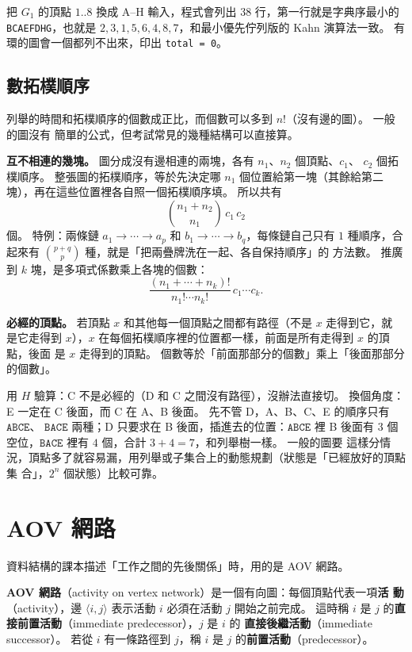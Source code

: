 把 $G_1$ 的頂點 $1..8$ 換成 A--H 輸入，程式會列出 $38$ 行，第一行就是字典序最小的
\texttt{BCAEFDHG}，也就是 $2, 3, 1, 5, 6, 4, 8, 7$，和最小優先佇列版的 Kahn 演算法一致。
有環的圖會一個都列不出來，印出 \texttt{total = 0}。

\subsection{數拓樸順序}

列舉的時間和拓樸順序的個數成正比，而個數可以多到 $n!$（沒有邊的圖）。 一般的圖沒有
簡單的公式，但考試常見的幾種結構可以直接算。

\textbf{互不相連的幾塊。} 圖分成沒有邊相連的兩塊，各有 $n_1$、$n_2$ 個頂點、$c_1$、
$c_2$ 個拓樸順序。 整張圖的拓樸順序，等於先決定哪 $n_1$ 個位置給第一塊（其餘給第二
塊），再在這些位置裡各自照一個拓樸順序填。 所以共有
\[
\binom{n_1 + n_2}{n_1} \, c_1 \, c_2
\]
個。 特例：兩條鏈 $a_1 \to \cdots \to a_p$ 和 $b_1 \to \cdots \to b_q$，每條鏈自己只有
$1$ 種順序，合起來有 $\binom{p + q}{p}$ 種，就是「把兩疊牌洗在一起、各自保持順序」的
方法數。 推廣到 $k$ 塊，是多項式係數乘上各塊的個數：
\[
\frac{(n_1 + \cdots + n_k)!}{n_1! \cdots n_k!} \, c_1 \cdots c_k.
\]

\textbf{必經的頂點。} 若頂點 $x$ 和其他每一個頂點之間都有路徑（不是 $x$ 走得到它，就
是它走得到 $x$），$x$ 在每個拓樸順序裡的位置都一樣，前面是所有走得到 $x$ 的頂點，後面
是 $x$ 走得到的頂點。 個數等於「前面那部分的個數」乘上「後面那部分的個數」。

用 $H$ 驗算：C 不是必經的（D 和 C 之間沒有路徑），沒辦法直接切。 換個角度：E 一定在 C
後面，而 C 在 A、B 後面。 先不管 D，A、B、C、E 的順序只有 $\texttt{ABCE}$、
$\texttt{BACE}$ 兩種；D 只要求在 B 後面，插進去的位置：$\texttt{ABCE}$ 裡 B 後面有
$3$ 個空位，$\texttt{BACE}$ 裡有 $4$ 個，合計 $3 + 4 = 7$，和列舉樹一樣。 一般的圖要
這樣分情況，頂點多了就容易漏，用列舉或子集合上的動態規劃（狀態是「已經放好的頂點集
合」，$2^n$ 個狀態）比較可靠。

\section{AOV 網路}
\label{sec:tps-aov}

資料結構的課本描述「工作之間的先後關係」時，用的是 AOV 網路。

\begin{definition}[AOV 網路]
\label{def:tps-aov}
\textbf{AOV 網路}（activity on vertex network）是一個有向圖：每個頂點代表一項\textbf{活
動}（activity），邊 $\langle i, j \rangle$ 表示活動 $i$ 必須在活動 $j$ 開始之前完成。
這時稱 $i$ 是 $j$ 的\textbf{直接前置活動}（immediate predecessor），$j$ 是 $i$ 的
\textbf{直接後繼活動}（immediate successor）。 若從 $i$ 有一條路徑到 $j$，稱 $i$ 是 $j$
的\textbf{前置活動}（predecessor）。
\end{definition}

